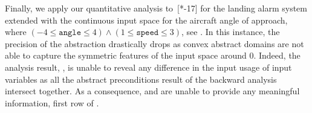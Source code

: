 \begin{table}[t]
  \caption{Quantitative input usage for~.}
  \centering
\end{table}

Finally, we apply our quantitative analysis to~[*-17] for the landing alarm system extended with the  continuous input space for the aircraft angle of approach, where $(-4 \le \texttt{angle} \le 4) \land (1 \le \texttt{speed} \le 3)$, see .
In this instance, the precision of the abstraction drastically drops as convex abstract domains are not able to capture the symmetric features of the input space around 0.
Indeed, the analysis result, \cf{} , is unable to reveal any difference in the input usage of input variables as all the abstract preconditions result of the backward analysis intersect together.
As a consequence, \abstractoutcomesname{} and \abstractrangename{} are unable to provide any meaningful information, first row of .

